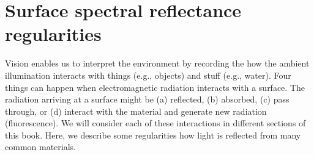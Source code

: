 \documentclass[
  letterpaper,
]{book}
\begin{document}
\section{Surface spectral reflectance
regularities}\label{surface-spectral-reflectance-regularities}

Vision enables us to interpret the environment by recording the how the
ambient illumination interacts with things (e.g., objects) and stuff
(e.g., water). Four things can happen when electromagnetic radiation
interacts with a surface. The radiation arriving at a surface might be
(a) reflected, (b) absorbed, (c) pass through, or (d) interact with the
material and generate new radiation (fluorescence). We will consider
each of these interactions in different sections of this book. Here, we
describe some regularities how light is reflected from many common
materials.
\end{document}
